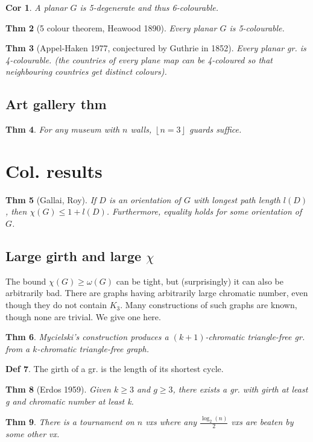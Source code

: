 \documentclass[11pt, fleqn, a4paper, landscape]{article}
\theoremstyle{plain} %
\newtheorem{thm}{Thm}
\newtheorem{cor}[thm]{Cor}
\theoremstyle{remark} %
\theoremstyle{definition} %
\newtheorem{defi}[thm]{Def}
\begin{document}
\begin{multicols}{5}
\begin{cor}
A planar $G$ is 5-degenerate and thus 6-colourable.
\end{cor}
\begin{thm}[5 colour theorem, Heawood 1890]
Every planar $G$ is 5-colourable.
\end{thm}

\begin{thm}[Appel-Haken 1977, conjectured by Guthrie in 1852]
Every planar gr. is 4-colourable. (the countries of every plane map can be 4-coloured so that neighbouring countries get
distinct colours).
\end{thm}
\addtocounter{thm}{1}
\subsection{Art gallery thm}

\begin{thm}
For any museum with $n$ walls, $\left\lfloor n=3\right\rfloor$ guards suffice.
\end{thm}

\section{Col. results}
\begin{thm}[Gallai, Roy]
If $D$ is an orientation of $G$ with longest path length $l(D)$, then $\chi(G) \le 1 + l(D)$. Furthermore, equality holds for some orientation of $G$.
\end{thm} 

\subsection{Large girth and large $\chi$}

The bound $\chi(G) \ge \omega(G)$ can be tight, but (surprisingly) it can also be arbitrarily bad. There are graphs having arbitrarily large chromatic number, even though they do not contain $K_3$. Many constructions of such graphs are known, though none are trivial. We give one here.
\addtocounter{thm}{1}
\begin{thm}
Mycielski’s construction produces a $(k + 1)$-chromatic triangle-free gr. from a $k$-chromatic triangle-free graph.
\end{thm}

\begin{defi}
The girth of a gr. is the length of its shortest cycle.
\end{defi}
\begin{thm}[Erdos 1959]
Given $k \ge 3$ and $g \ge 3$, there exists a gr. with girth at least g and
chromatic number at least k.
\end{thm} 
\addtocounter{thm}{2}
\begin{thm}
There is a tournament on $n$ vxs where any $\frac{\log_2(n)}{2}$ vxs are beaten by some other vx.
\end{thm}

\end{multicols}
\end{document}
